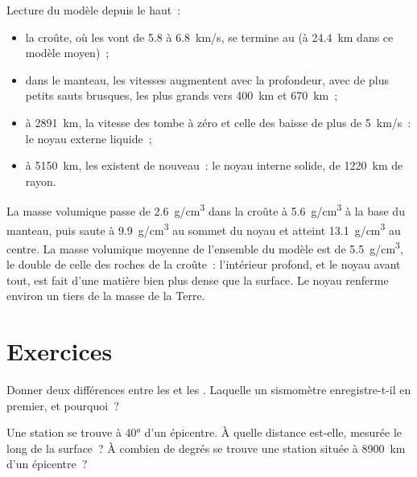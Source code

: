 Lecture du modèle depuis le haut~:
\begin{itemize}
  \item la croûte, où les  vont de 5.8 à \qty{6.8}{km/s}, se termine
        au  (à \qty{24.4}{km} dans ce modèle moyen)~;
  \item dans le manteau, les vitesses augmentent avec la profondeur, avec de
        plus petits sauts brusques, les plus grands vers \qty{400}{km} et
        \qty{670}{km}~;
  \item à \qty{2891}{km}, la vitesse des  tombe à zéro et celle des
         baisse de plus de \qty{5}{km/s}~: le noyau externe liquide~;
  \item à \qty{5150}{km}, les  existent de nouveau~: le noyau interne
        solide, de \qty{1220}{km} de rayon.
\end{itemize}

La masse volumique passe de \qty{2.6}{g/cm^3} dans la croûte à
\qty{5.6}{g/cm^3} à la base du manteau, puis saute à \qty{9.9}{g/cm^3} au
sommet du noyau et atteint \qty{13.1}{g/cm^3} au centre. La masse volumique
moyenne de l'ensemble du modèle est de \qty{5.5}{g/cm^3}, le double de celle
des roches de la croûte~: l'intérieur profond, et le noyau avant tout, est
fait d'une matière bien plus dense que la surface. Le noyau renferme environ
un tiers de la masse de la Terre.

\section{Exercices}

\begin{exercise}[$\star$]\label{exo:g11:seismic-structure:1}
Donner deux différences entre les  et les . Laquelle un
sismomètre enregistre-t-il en premier, et pourquoi~?
\end{exercise}

\begin{exercise}[$\star$]\label{exo:g11:seismic-structure:2}
Une station se trouve à \ang{40} d'un épicentre. À quelle distance est-elle,
mesurée le long de la surface~? À combien de degrés se trouve une station
située à \qty{8900}{km} d'un épicentre~?
\end{exercise}

